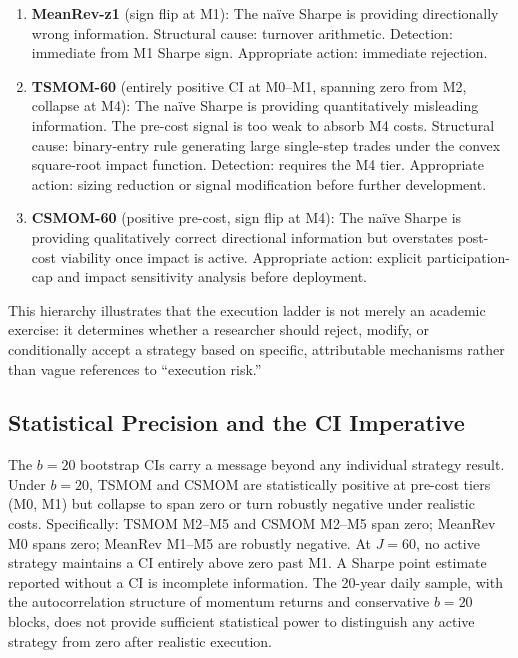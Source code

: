 \documentclass[12pt]{article}
\begin{document}
\begin{enumerate}[nosep]
  \item \textbf{MeanRev-z1} (sign flip at M1): The na\"{i}ve Sharpe
    is providing directionally wrong information. Structural cause:
    turnover arithmetic. Detection: immediate from M1 Sharpe sign.
    Appropriate action: immediate rejection.

  \item \textbf{TSMOM-60} (entirely positive CI at M0--M1, spanning
    zero from M2, collapse at M4): The na\"{i}ve Sharpe is providing
    quantitatively misleading information. The pre-cost signal is too
    weak to absorb M4 costs. Structural cause: binary-entry rule
    generating large single-step trades under the convex square-root
    impact function. Detection: requires the
    M4 tier. Appropriate action: sizing reduction or signal
    modification before further development.

  \item \textbf{CSMOM-60} (positive pre-cost, sign flip at M4): The na\"{i}ve
    Sharpe is providing qualitatively correct directional information
    but overstates post-cost viability once impact is active. Appropriate
    action: explicit participation-cap and impact sensitivity analysis
    before deployment.
\end{enumerate}

This hierarchy illustrates that the execution ladder is not merely
an academic exercise: it determines whether a researcher should
reject, modify, or conditionally accept a strategy based on
specific, attributable mechanisms rather than vague references to
``execution risk.''

\subsection{Statistical Precision and the CI Imperative}
\label{sec:stats_precision}

The $b = 20$ bootstrap CIs carry a message beyond any individual
strategy result. Under $b = 20$, TSMOM and CSMOM are statistically
positive at pre-cost tiers (M0, M1) but collapse to span zero or turn
robustly negative under realistic costs. Specifically: TSMOM M2--M5
and CSMOM M2--M5 span zero; MeanRev M0 spans zero; MeanRev M1--M5
are robustly negative. At $J=60$, no active strategy maintains a CI
entirely above zero past M1. A Sharpe point estimate reported without
a CI is
incomplete information. The 20-year daily sample, with the
autocorrelation structure of momentum returns and conservative
$b = 20$ blocks, does not provide sufficient statistical power
to distinguish any active strategy from zero after realistic execution.
\end{document}
